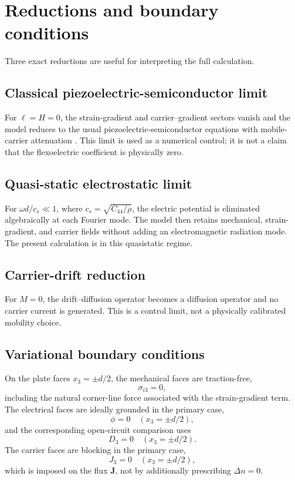 \section{Reductions and boundary conditions}\label{sec:reductions}

Three exact reductions are useful for interpreting the full calculation.

\subsection{Classical piezoelectric-semiconductor limit}
For \(\ell=H=0\), the strain-gradient and carrier--gradient sectors vanish and the
model reduces to the usual piezoelectric-semiconductor equations with mobile-carrier
attenuation \cite{hutson1962}. This limit is used as a numerical control; it is not
a claim that the flexoelectric coefficient is physically zero.

\subsection{Quasi-static electrostatic limit}
For \(\omega d/c_s\ll1\), where \(c_s=\sqrt{C_{44}/\rho}\), the electric potential
is eliminated algebraically at each Fourier mode. The model then retains
mechanical, strain-gradient, and carrier fields without adding an electromagnetic
radiation mode. The present calculation is in this quasistatic regime.

\subsection{Carrier-drift reduction}
For \(M=0\), the drift--diffusion operator becomes a diffusion operator and no
carrier current is generated. This is a control limit, not a physically calibrated
mobility choice.

\subsection{Variational boundary conditions}
On the plate faces \(x_3=\pm d/2\), the mechanical faces are traction-free,
\[
\sigma_{i3}=0,
\]
including the natural corner-line force associated with the strain-gradient term.
The electrical faces are ideally grounded in the primary case,
\[
\phi=0\quad(x_3=\pm d/2),
\]
and the corresponding open-circuit comparison uses
\[
D_3=0\quad(x_3=\pm d/2).
\]
The carrier faces are blocking in the primary case,
\[
J_3=0\quad(x_3=\pm d/2),
\]
which is imposed on the flux \(\mathbf J\), not by additionally prescribing
\(\Delta n=0\).

